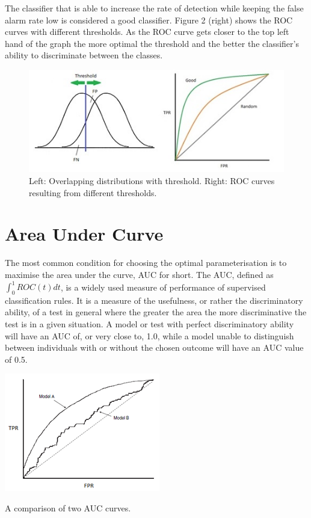 The classifier that is able to increase the rate of detection while keeping the false alarm rate low is considered a good classifier. Figure 2 (right) shows the ROC curves with different thresholds. As the ROC curve gets closer to the top left hand of the graph the more optimal the threshold and the better the classifier's ability to discriminate between the classes.

\begin{figure}
	\includegraphics{roc_curves/Figure2.png}
	\caption{Left: Overlapping distributions with threshold. Right: ROC curves resulting from different thresholds.}
	\label{fig:roc-curves}
\end{figure}

\section{Area Under Curve} 
The most common condition for choosing the optimal parameterisation is to maximise the area under the curve, AUC for short. The AUC, defined as $\int_{0}^{1} ROC(t) dt$, is a widely used measure of performance of supervised classification rules. It is a measure of the usefulness, or rather the discriminatory ability, of a test in general where the greater the area the more discriminative the test is in a given situation. A model or test with perfect discriminatory ability will have an AUC of, or very close to, 1.0, while a model unable to distinguish between individuals with or without the chosen outcome will have an AUC value of 0.5. 

\begin{marginfigure}
	\includegraphics{roc_curves/Figure3.png}
	\caption{A comparison of two AUC curves.}
	\label{fig:two-curves}
\end{marginfigure}

